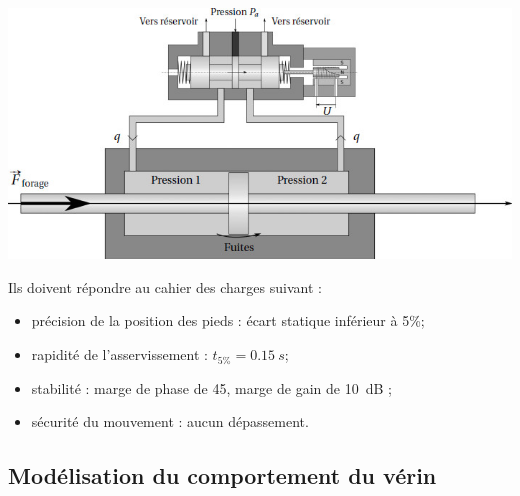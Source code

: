 \documentclass[10pt,fleqn]{article} %
\begin{document}
\begin{multicols}{2}
\begin{center}
\includegraphics[width=\linewidth]{images/fig_02}
\end{center}
Ils doivent répondre au cahier des charges suivant :
\begin{itemize}
\item précision de la position des pieds : écart statique inférieur à 5\%;
\item rapidité de l’asservissement : $t_{5\%} = \SI{0,15}{s}$;
\item stabilité : marge de phase de 45\degres, marge de gain de \SI{10}{dB} ;
\item sécurité du mouvement : aucun dépassement.
\end{itemize}

\subsection*{Modélisation du comportement du vérin}


\end{multicols}
\end{document}
